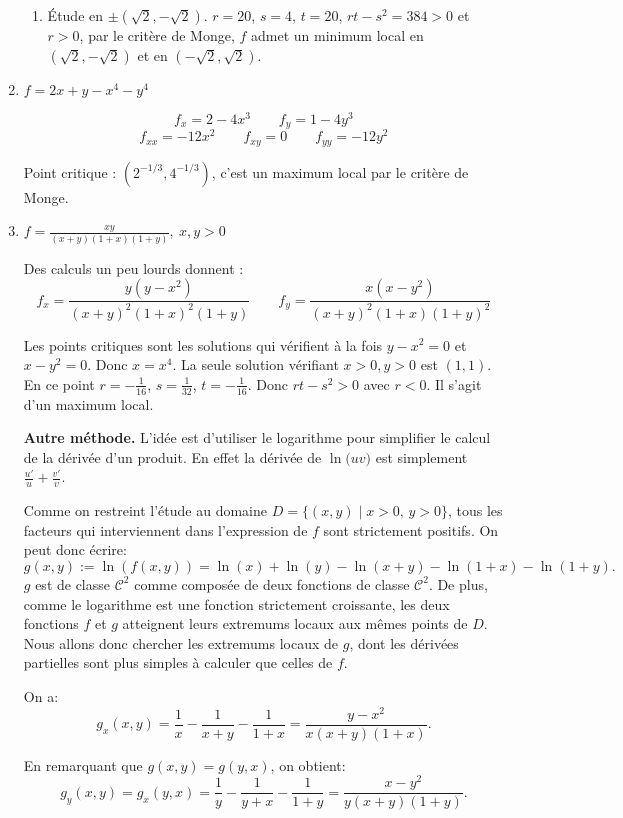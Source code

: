 \documentclass[11pt,a4paper]{article}
\theoremstyle{exostyle}
\begin{document}
\begin{enumerate}
\begin{enumerate}
	\item Étude en $\pm(\sqrt2,-\sqrt2)$.
	$r=20$, $s=4$, $t=20$, $rt-s^2 = 384>0$ et $r>0$, par le critère de Monge, $f$ admet un minimum local en $(\sqrt2,-\sqrt2)$ et en $(-\sqrt2,\sqrt2)$.
	
	\end{enumerate}
	

	\item $f = 2x+y-x^4-y^4$
	
	\[
	f_x = 2-4x^3
	\qquad
	f_y = 1-4y^3
	\]
	\[
	f_{xx} = -12x^2
	\qquad 
	f_{xy}= 0
	\qquad 
	f_{yy}= -12y^2
	\]
	
	Point critique : $(2^{-1/3},4^{-1/3})$, c'est un maximum local par le critère de Monge.	
	
	
	
	\item $f = \frac {xy}{(x+y)(1+x)(1+y)},\ x,y> 0$
	
	Des calculs un peu lourds donnent :
	\[
	f_x = \frac {y(y-x^2)}{(x+y)^2(1+x)^2(1+y)}
	\qquad
	f_y = \frac {x(x-y^2)}{(x+y)^2(1+x)(1+y)^2}
	\]
	
	Les points critiques sont les solutions qui vérifient à la fois $y-x^2=0$ et $x-y^2=0$.
	Donc $x=x^4$. La seule solution vérifiant $x>0,y>0$ est $(1,1)$.
	En ce point $r=-\frac1{16}$, $s=\frac1{32}$, $t=-\frac1{16}$.
	Donc $rt-s^2 > 0$ avec $r<0$. Il s'agit d'un maximum local.
	
	\textbf{Autre méthode.}
	L'idée est d'utiliser le logarithme pour simplifier le calcul de la dérivée d'un produit.
	En effet la dérivée de $\ln\big( u v \big)$ est simplement $\frac{u'}{u} + \frac{v'}{v}$.
		
	Comme on restreint l'étude au domaine $ D = \{ (x,y) \mid x>0, \, y>0\}$, tous les facteurs qui interviennent dans l'expression de $f$ sont strictement positifs. On peut donc écrire: 
	\[
	g(x,y) := \ln(f(x,y)) = \ln(x) + \ln(y) - \ln(x+y) - \ln(1+x) - \ln(1+y). 
	\]
	$g$ est de classe $\mathcal{C}^2$ comme composée de deux fonctions de classe $\mathcal{C}^2$. De plus, comme le logarithme est une fonction strictement croissante, les deux fonctions $f$ et $g$ atteignent leurs extremums locaux aux mêmes points de $D$. Nous allons donc chercher les extremums locaux de $g$, dont les dérivées partielles sont plus simples à calculer que celles de $f$.
	
	On a:
	\[
		g_x (x,y) =\frac{1}{x}-\frac{1}{x+y}-\frac{1}{1+x}  = \frac{y-x^2}{x(x+y)(1+x)}.
	\]
	
	En remarquant que $g(x,y) = g(y,x)$, on obtient:
	\[
		g_y (x,y) = g_x(y,x) = \frac{1}{y}-\frac{1}{y+x}-\frac{1}{1+y} = \frac{x-y^2}{y(x+y)(1+y)}.
	\]
	

\end{enumerate}
\end{document}
